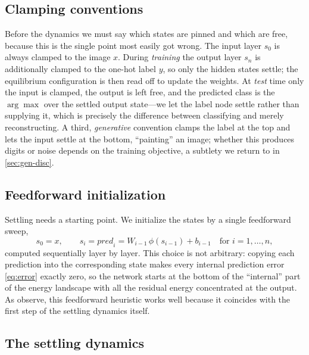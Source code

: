 \subsection{Clamping conventions}

Before the dynamics we must say which states are pinned and which are free, because this is the
single point most easily got wrong. The input layer $s_0$ is always clamped to the image $x$.
During \emph{training} the output layer $s_n$ is additionally clamped to the one-hot label $y$, so
only the hidden states settle; the equilibrium configuration is then read off to update the
weights. At \emph{test} time only the input is clamped, the output is left free, and the predicted
class is the $\arg\max$ over the settled output state---we let the label node settle rather than
supplying it, which is precisely the difference between classifying and merely reconstructing.
A third, \emph{generative} convention clamps the label at the top and lets the input settle at the
bottom, ``painting'' an image; whether this produces digits or noise depends on the training
objective, a subtlety we return to in \cref{sec:gen-disc}.

\subsection{Feedforward initialization}

Settling needs a starting point. We initialize the states by a single feedforward sweep,
\begin{equation}
  s_0 = x, \qquad s_i = \mathit{pred}_i = W_{i-1}\,\phi(s_{i-1}) + b_{i-1}
  \quad\text{for } i = 1,\dots,n,
\end{equation}
computed sequentially layer by layer. This choice is not arbitrary: copying each prediction into
the corresponding state makes every internal prediction error \cref{eq:error} exactly zero, so the
network starts at the bottom of the ``internal'' part of the energy landscape with all the
residual energy concentrated at the output. As \citet{goemaere2025epc} observe, this feedforward
heuristic works well because it coincides with the first step of the settling dynamics itself.

\subsection{The settling dynamics}


